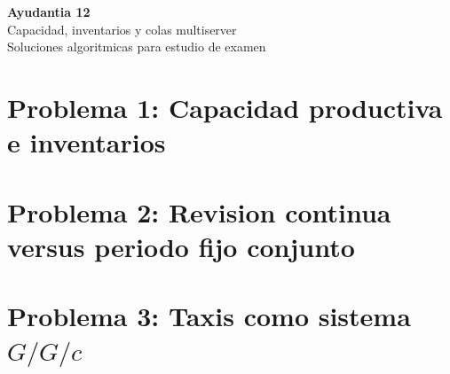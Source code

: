 \documentclass[11pt, a4paper]{article}
\begin{document}
\begin{center}
{\Huge\bfseries\color{gopcyan} Ayudantia 12}\\
{\Large Capacidad, inventarios y colas multiserver}\\
\vspace{0.2cm}
{\small Soluciones algoritmicas para estudio de examen}
\end{center}

\tableofcontents
\newpage

\section{Problema 1: Capacidad productiva e inventarios}

\section{Problema 2: Revision continua versus periodo fijo conjunto}

\section{Problema 3: Taxis como sistema \texorpdfstring{$G/G/c$}{G/G/c}}
\end{document}
